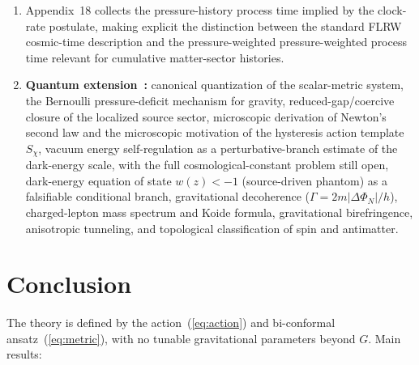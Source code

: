 \documentclass[aps,prd,onecolumn,superscriptaddress,nofootinbib,showpacs,12pt]{revtex4-2}
\begin{document}
\begin{enumerate}
  $\chi$ coupled to quasi-static $\varphi$ gradients) is formulated
  as an effective collective-field template in Appendix~13:
  field equation, ghost freedom, gradient stability,
  standalone sourced-KG well-posedness, and quasi-static
  overdamped reduction to the phenomenological relaxation law
  with effective timescale $\tau^{-1} = \lambda c^{2}/(3H)$.
  The microscopic tracking stiffness
  $\lambda_{\rm micro}$ is tied to the oscillon quasi-normal
  mode structure in~\cite{Lotishvili2026Q}, while the full
  backreacting two-field principal-symbol analysis and the
  macroscopic collective relaxation scale remain open.
\item Appendix~18 collects the pressure-history process
  time implied by the clock-rate postulate, making
  explicit the distinction between the standard FLRW
  cosmic-time description and the pressure-weighted
  pressure-weighted process time relevant for cumulative
  matter-sector histories.
\item \textbf{Quantum extension~\cite{Lotishvili2026Q}:}
  canonical quantization of the scalar-metric system,
  the Bernoulli pressure-deficit mechanism for gravity,
  reduced-gap/coercive closure of the localized source sector,
  microscopic derivation of Newton's second law and the
  microscopic motivation of the hysteresis action template
  $S_{\chi}$, vacuum energy
  self-regulation as a perturbative-branch estimate of the
  dark-energy scale, with the full cosmological-constant
  problem still open, dark-energy equation of state
  $w(z) < -1$ (source-driven phantom) as a falsifiable
  conditional branch,
  gravitational decoherence
  ($\Gamma = 2m|\Delta\Phi_N|/h$), charged-lepton
  mass spectrum and Koide formula, gravitational
  birefringence, anisotropic tunneling, and
  topological classification of spin and antimatter.
\end{enumerate}

\section{Conclusion}\label{sec:conclusion}

The theory is defined by the action~(\ref{eq:action}) and
bi-conformal ansatz~(\ref{eq:metric}), with no tunable
gravitational parameters beyond $G$.  Main results:
\end{document}
